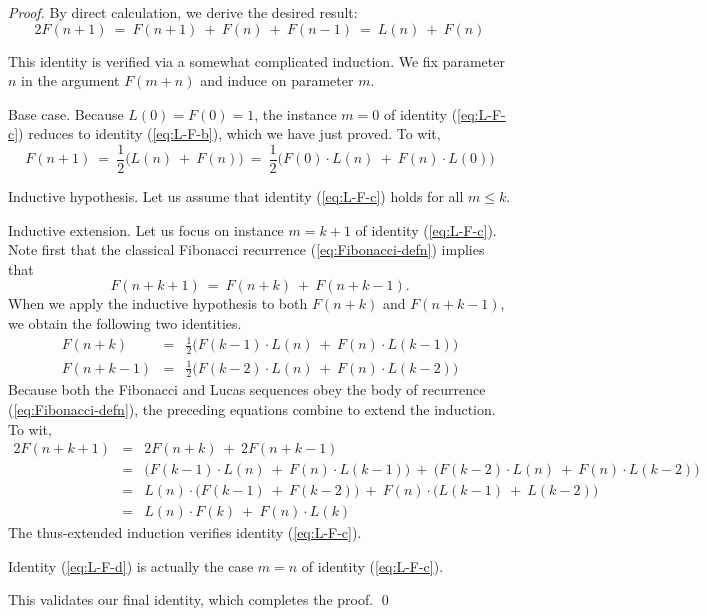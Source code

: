 \begin{proof}
By direct calculation, we derive the desired result:
\[ 2 F(n+1) \ = \ F(n+1) \ + \ F(n) \ + \ F(n-1) \ = \ L(n) \ + \ F(n)  \]

\bigskip

This identity is verified via a somewhat complicated induction.  We fix parameter $n$ in the argument $F(m+n)$ and induce on parameter $m$.

\medskip

\noindent
{\sf Base case.}
Because $L(0) = F(0)= 1$, the instance $m=0$ of identity (\ref{eq:L-F-c}) reduces to identity (\ref{eq:L-F-b}), which we have just proved.  To wit,
\[ F(n+1) \ = \ \frac{1}{2} \big( L(n) \ + \ F(n) \big)
\ = \ \frac{1}{2} \big( F(0) \cdot L(n) \ + \ F(n) \cdot L(0) \big)
\]

\medskip 

\noindent
{\sf Inductive hypothesis}.
Let us assume that identity (\ref{eq:L-F-c}) holds for all $m \leq k$.

\medskip

\noindent
{\sf Inductive extension}.
Let us focus on instance $m = k+1$ of identity (\ref{eq:L-F-c}).  Note first that the classical Fibonacci recurrence (\ref{eq:Fibonacci-defn}) implies that
\[ F(n + k +1) \ = \ F(n + k) \ + \ F(n + k - 1). \]
When we apply the inductive hypothesis to both $F(n + k)$ and $F(n + k - 1)$, we obtain the following two identities.
\begin{eqnarray*}
F(n + k) & = & \frac{1}{2} \big( F(k-1) \cdot L(n) \ + \ F(n) \cdot L(k-1) \big) \\
F(n + k - 1) & = & \frac{1}{2} \big( F(k-2) \cdot L(n) \ + \ F(n) \cdot L(k-2) \big)
\end{eqnarray*}
Because both the Fibonacci and Lucas sequences obey the body of recurrence (\ref{eq:Fibonacci-defn}), the preceding equations combine to extend the induction.  To wit,
\begin{eqnarray*}
2 F(n + k +1) & = & 2 F(n + k) \ + \ 2 F(n + k - 1) \\
              & = & 
\big( F(k-1) \cdot L(n) \ + \ F(n) \cdot L(k-1) \big)
\ + \
\big( F(k-2) \cdot L(n) \ + \ F(n) \cdot L(k-2) \big) \\
              & = &
L(n) \cdot \big( F(k-1) \ + \ F(k-2) \big)
\ + \
F(n) \cdot \big( L(k-1) \ + \ L(k-2) \big) \\
              & = &
L(n) \cdot F(k) \ + \ F(n) \cdot L(k)
\end{eqnarray*}
The thus-extended induction verifies identity (\ref{eq:L-F-c}).

\bigskip

Identity (\ref{eq:L-F-d}) is actually the case $m=n$ of identity (\ref{eq:L-F-c}).

\smallskip

This validates our final identity, which completes the proof.  \qed
\end{proof}


